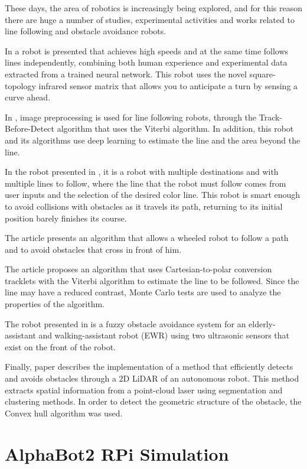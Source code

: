\documentclass[conference]{IEEEtran}
\begin{document}
These days, the area of robotics is increasingly being explored, and for this reason there are huge a number of studies, experimental activities and works related to line following and obstacle avoidance robots.

In \cite{b4} a robot is presented that achieves high speeds and at the same time follows lines independently, combining both human experience and experimental data extracted from a trained neural network. This robot uses the novel square-topology infrared sensor matrix that allows you to anticipate a turn by sensing a curve ahead.

In \cite{b5}, image preprocessing is used for line following robots, through the Track-Before-Detect algorithm that uses the Viterbi algorithm. In addition, this robot and its algorithms use deep learning to estimate the line and the area beyond the line.

In the robot presented in \cite{b6}, it is a robot with multiple destinations and with multiple lines to follow, where the line that the robot must follow comes from user inputs and the selection of the desired color line. This robot is smart enough to avoid collisions with obstacles as it travels its path, returning to its initial position barely finishes its course.

The article \cite{b7} presents an algorithm that allows a wheeled robot to follow a path and to avoid obstacles that cross in front of him.

The article \cite{b8} proposes an algorithm that uses Cartesian-to-polar conversion tracklets with the Viterbi algorithm to estimate the line to be followed. Since the line may have a reduced contrast, Monte Carlo tests are used to analyze the properties of the algorithm.

The robot presented in \cite{b9} is a fuzzy obstacle avoidance system for an elderly-assistant and walking-assistant robot (EWR) using two ultrasonic sensors that exist on the front of the robot.

Finally, paper \cite{b10} describes the implementation of a method that efficiently detects and avoids obstacles through a 2D LiDAR of an autonomous robot. This method extracts spatial information from a point-cloud laser using segmentation and clustering methods. In order to detect the geometric structure of the obstacle, the Convex hull algorithm was used.

\section{AlphaBot2 RPi Simulation} \label{alpha}
\end{document}
